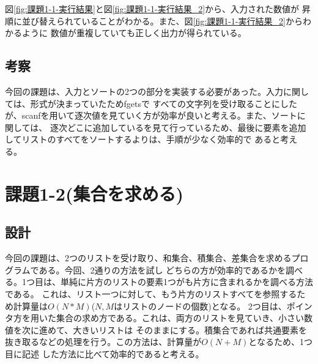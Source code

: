 \documentclass[a4j]{ltjsarticle}
\begin{document}
      図\ref{fig:課題1-1-実行結果}と図\ref{fig:課題1-1-実行結果_2}から、入力された数値が
      昇順に並び替えられていることがわかる。また、図\ref{fig:課題1-1-実行結果_2}からわかるように
      数値が重複していても正しく出力が得られている。
      
\clearpage
    \subsection{考察}
    今回の課題は、入力とソートの2つの部分を実装する必要があった。入力に関しては、形式が決まっていたためfgetsで
    すべての文字列を受け取ることにしたが、scanfを用いて逐次値を見ていく方が効率が良いと考える。また、ソートに関しては、
    逐次どこに追加しているを見て行っているため、最後に要素を追加してリストのすべてをソートするよりは、手順が少なく効率的で
    あると考える。

  \section{課題1-2(集合を求める)}
    \subsection{設計}
      今回の課題は、2つのリストを受け取り、和集合、積集合、差集合を求めるプログラムである。今回、2通りの方法を試し
      どちらの方が効率的であるかを調べる。1つ目は、単純に片方のリストの要素1つがも片方に含まれるかを調べる方法である。
      これは、リスト一つに対して、もう片方のリストすべてを参照するため計算量は$O(N*M)$($N,M$はリストのノードの個数)となる。
      2つ目は、ポインタ方を用いた集合の求め方である。これは、両方のリストを見ていき、小さい数値を次に進めて、大きいリストは
      そのままにする。積集合であれば共通要素を抜き取るなどの処理を行う。この方法は、計算量が$O(N+M)$となるため、1つ目に記述
      した方法に比べて効率的であると考える。
\end{document}
